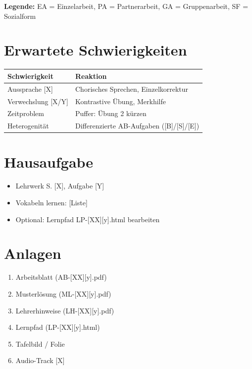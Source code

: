\documentclass[11pt,a4paper]{article}
\begin{document}
\textbf{Legende:} EA = Einzelarbeit, PA = Partnerarbeit, GA = Gruppenarbeit, SF = Sozialform

\section{Erwartete Schwierigkeiten}

\begin{tabular}{|p{5cm}|p{8cm}|}
\hline
\textbf{Schwierigkeit} & \textbf{Reaktion} \\
\hline
Aussprache [X] & Chorisches Sprechen, Einzelkorrektur \\
\hline
Verwechslung [X/Y] & Kontrastive Übung, Merkhilfe \\
\hline
Zeitproblem & Puffer: Übung 2 kürzen \\
\hline
Heterogenität & Differenzierte AB-Aufgaben ([B]/[S]/[E]) \\
\hline
\end{tabular}

\section{Hausaufgabe}

\begin{itemize}
    \item Lehrwerk S. [X], Aufgabe [Y]
    \item Vokabeln lernen: [Liste]
    \item Optional: Lernpfad LP-[XX][y].html bearbeiten
\end{itemize}

\section{Anlagen}

\begin{enumerate}
    \item Arbeitsblatt (AB-[XX][y].pdf)
    \item Musterlösung (ML-[XX][y].pdf)
    \item Lehrerhinweise (LH-[XX][y].pdf)
    \item Lernpfad (LP-[XX][y].html)
    \item Tafelbild / Folie
    \item Audio-Track [X]
\end{enumerate}
\end{document}
